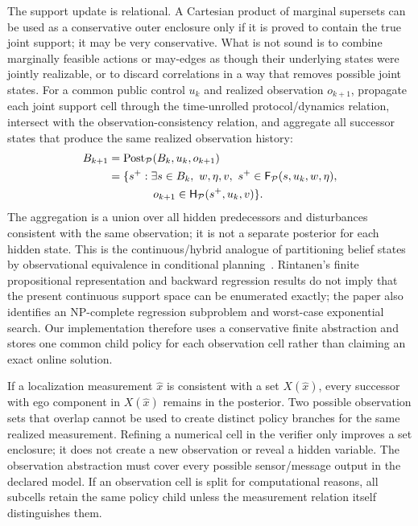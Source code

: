 \documentclass[letterpaper]{article} %
\begin{document}
The support update is relational. A Cartesian product of marginal supersets can be used as a conservative outer enclosure only if it is proved to contain the true joint support; it may be very conservative. What is not sound is to combine marginally feasible actions or may-edges as though their underlying states were jointly realizable, or to discard correlations in a way that removes possible joint states. For a common public control $u_k$ and realized observation $o_{k+1}$, propagate each joint support cell through the time-unrolled protocol/dynamics relation, intersect with the observation-consistency relation, and aggregate all successor states that produce the same realized observation history:
\begin{equation}
\begin{aligned}
B_{k+1}&=\operatorname{Post}_{\mathcal P}(B_k,u_k,o_{k+1})\\
&=\{s^+:\exists s\in B_k,\ w,\eta,v,\ 
s^+\in\mathsf F_{\mathcal P}(s,u_k,w,\eta),\\
&\hspace{4.0em}o_{k+1}\in\mathsf H_{\mathcal P}(s^+,u_k,v)\}.
\end{aligned}
\label{eq:belief-update-app}
\end{equation}
The aggregation is a union over all hidden predecessors and disturbances consistent with the same observation; it is not a separate posterior for each hidden state. This is the continuous/hybrid analogue of partitioning belief states by observational equivalence in conditional planning~\citep{rintanen2005conditional}. Rintanen's finite propositional representation and backward regression results do not imply that the present continuous support space can be enumerated exactly; the paper also identifies an NP-complete regression subproblem and worst-case exponential search. Our implementation therefore uses a conservative finite abstraction and stores one common child policy for each observation cell rather than claiming an exact online solution.

If a localization measurement $\hat x$ is consistent with a set $X(\hat x)$, every successor with ego component in $X(\hat x)$ remains in the posterior. Two possible observation sets that overlap cannot be used to create distinct policy branches for the same realized measurement. Refining a numerical cell in the verifier only improves a set enclosure; it does not create a new observation or reveal a hidden variable. The observation abstraction must cover every possible sensor/message output in the declared model. If an observation cell is split for computational reasons, all subcells retain the same policy child unless the measurement relation itself distinguishes them.
\end{document}

